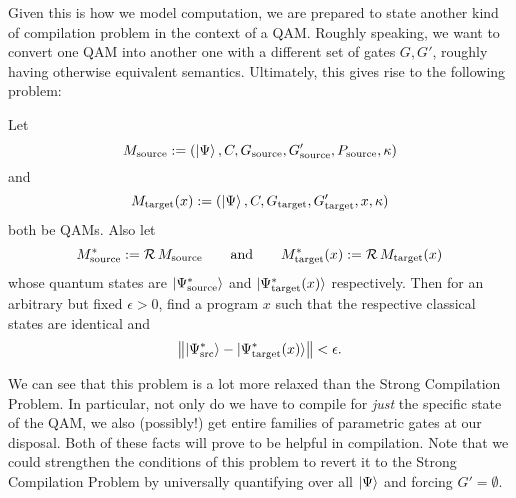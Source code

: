 Given this is how we model computation, we are prepared to state another kind of compilation problem in the context of a QAM. Roughly speaking, we want to convert one QAM into another one with a different set of gates $G, G'$, roughly having otherwise equivalent semantics. Ultimately, this gives rise to the following problem:
\begin{problem}
Let \[M_{\textrm{source}} := (\ket{\Psi}, C, G_{\textrm{source}}, G'_{\textrm{source}}, P_{\textrm{source}}, \kappa)\] and \[M_{\textrm{target}}(x) := (\ket{\Psi}, C, G_{\textrm{target}}, G'_{\textrm{target}}, x, \kappa)\] both be QAMs. Also let
\begin{displaymath}
M^*_{\textrm{source}} := \operatorname{\mathcal{R}} M_{\textrm{source}}\qquad\text{and}\qquad
M^*_{\textrm{target}}(x) := \operatorname{\mathcal{R}} M_{\textrm{target}}(x)
\end{displaymath}
whose quantum states are $\ket{\Psi^*_{\textrm{source}}}$ and $\ket{\Psi^*_{\textrm{target}}(x)}$ respectively. Then for an arbitrary but fixed $\epsilon>0$, find a program $x$ such that the respective classical states are identical and
\begin{displaymath}
\left\Vert\ket{\Psi^*_{\textrm{src}}} - \ket{\Psi^*_{\textrm{target}}(x)}\right\Vert < \epsilon.
\end{displaymath}
\end{problem}
We can see that this problem is a lot more relaxed than the Strong Compilation Problem. In particular, not only do we have to compile for \emph{just} the specific state of the QAM, we also (possibly!) get entire families of parametric gates at our disposal. Both of these facts will prove to be helpful in compilation. Note that we could strengthen the conditions of this problem to revert it to the Strong Compilation Problem by universally quantifying over all $\Ket{\Psi}$ and forcing $G'=\emptyset$.
